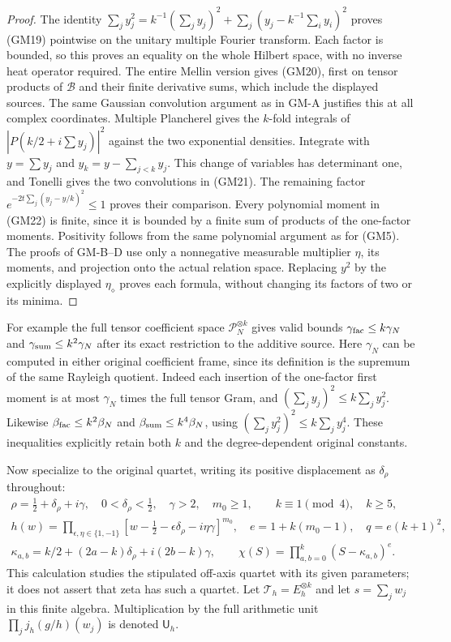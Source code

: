 \begin{proof}
The identity
$\sum_jy_j^2=k^{-1}(\sum_jy_j)^2+
\sum_j(y_j-k^{-1}\sum_i y_i)^2$ proves (GM19) pointwise on the
unitary multiple Fourier transform.  Each factor is bounded, so this
proves an equality on the whole Hilbert space, with no inverse heat
operator required.  The entire Mellin version gives (GM20), first on
tensor products of $\mathscr B$ and their finite derivative sums,
which include the displayed sources.  The same Gaussian convolution
argument as in GM-A justifies this at all complex coordinates.
Multiple Plancherel gives the $k$-fold integrals of
$|P(k/2+i\sum y_j)|^2$ against the two exponential densities.
Integrate with $y=\sum y_j$ and
$y_k=y-\sum_{j<k}y_j$.  This change of variables has determinant
one, and Tonelli gives the two convolutions in (GM21).  The remaining
factor $e^{-2t\sum_j(y_j-y/k)^2}\leq1$ proves their comparison.
Every polynomial moment in (GM22) is finite, since it is bounded by
a finite sum of products of the one-factor moments.  Positivity
follows from the same polynomial argument as for (GM5).
The proofs of GM-B--D use only a nonnegative measurable multiplier
$\eta$, its moments, and projection onto the actual relation space.
Replacing $y^2$ by the explicitly displayed $\eta_\diamond$ proves
each formula, without changing its factors of two or its minima.
\end{proof}

For example the full tensor coefficient space
$\mathcal P_N^{\otimes k}$ gives valid bounds
$\gamma_{\rm fac}\leq k\gamma_N$ and
$\gamma_{\rm sum}\leq k^2\gamma_N$ after its exact restriction to
the additive source.  Here $\gamma_N$ can be computed in either
original coefficient frame, since its definition is the supremum
of the same Rayleigh quotient.  Indeed each insertion of the
one-factor first moment is at most $\gamma_N$ times the full tensor
Gram, and $(\sum_jy_j)^2\leq k\sum_jy_j^2$.  Likewise
$\beta_{\rm fac}\leq k^2\beta_N$ and
$\beta_{\rm sum}\leq k^4\beta_N$, using
$(\sum_jy_j^2)^2\leq k\sum_jy_j^4$.  These inequalities explicitly
retain both $k$ and the degree-dependent original constants.

Now specialize to the original quartet, writing its positive
displacement as $\delta_\rho$ throughout:
\begin{equation}\tag{GM23}
 \begin{gathered}
 \rho=\tfrac12+\delta_\rho+i\gamma,\quad
 0<\delta_\rho<\tfrac12,\quad\gamma>2,\quad m_0\geq1,\qquad
 k\equiv1\pmod4,\quad k\geq5,\\
 h(w)=\prod_{\epsilon,\eta\in\{1,-1\}}
       [w-\tfrac12-\epsilon\delta_\rho-i\eta\gamma]^{m_0},
 \quad e=1+k(m_0-1),\quad q=e(k+1)^2,\\
 \kappa_{a,b}=k/2+(2a-k)\delta_\rho+i(2b-k)\gamma,\qquad
 \chi(S)=\prod_{a,b=0}^k(S-\kappa_{a,b})^e.
 \end{gathered}
\end{equation}
This calculation studies the stipulated off-axis quartet with its
given parameters; it does not assert that zeta has such a quartet.
Let $\mathcal T_h=E_h^{\otimes k}$ and let $s=\sum_jw_j$ in this
finite algebra.  Multiplication by the full arithmetic unit
$\prod_j j_h(g/h)(w_j)$ is denoted $\mathsf U_h$.

